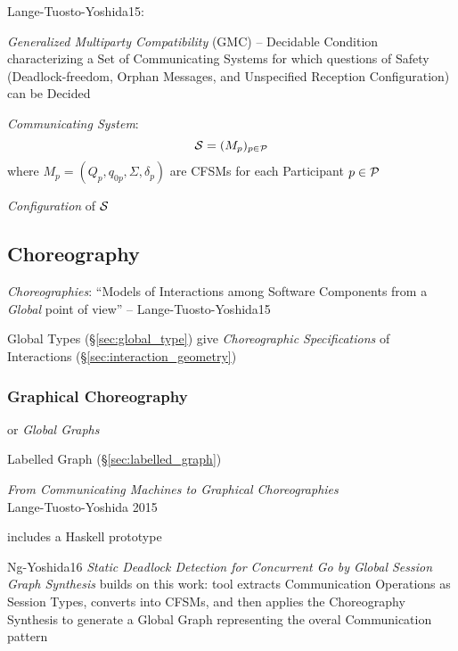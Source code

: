 Lange-Tuosto-Yoshida15:

\emph{Generalized Multiparty Compatibility} (GMC) -- Decidable
Condition characterizing a Set of Communicating Systems for which
questions of Safety (Deadlock-freedom, Orphan Messages, and
Unspecified Reception Configuration) can be Decided

\emph{Communicating System}:
\[
  \mathcal{S} = (M_p)_{p \in \mathcal{P}}
\]
where $M_p = (Q_p, q_{0p}, \Sigma, \delta_p)$ are CFSMs for each
Participant $p \in \mathcal{P}$

\emph{Configuration} of $\mathcal{S}$ %



\subsection{Choreography}\label{sec:choreography}

\emph{Choreographies}: ``Models of Interactions among Software
Components from a \emph{Global} point of view'' --
Lange-Tuosto-Yoshida15

\fist Global Types (\S\ref{sec:global_type}) give \emph{Choreographic
  Specifications} of Interactions (\S\ref{sec:interaction_geometry})



\subsubsection{Graphical Choreography}\label{sec:graphical_choreography}

or \emph{Global Graphs}

\fist Labelled Graph (\S\ref{sec:labelled_graph})

\begingroup

\newcommand{\party}{\mono}

\emph{From Communicating Machines to Graphical Choreographies} \\
Lange-Tuosto-Yoshida 2015

includes a Haskell prototype

Ng-Yoshida16 \emph{Static Deadlock Detection for Concurrent Go by
  Global Session Graph Synthesis} builds on this work: tool extracts
Communication Operations as Session Types, converts into CFSMs, and
then applies the Choreography Synthesis to generate a Global Graph
representing the overal Communication pattern

